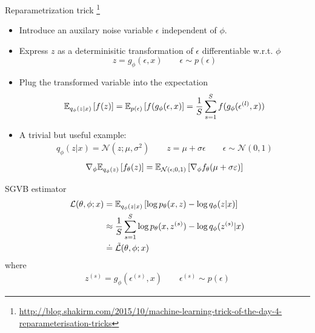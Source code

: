 \documentclass[unicode,11pt]{beamer}
\begin{document}
\begin{frame}{Reparametrization trick%
  \footnote{\url{http://blog.shakirm.com/2015/10/machine-learning-trick-of-the-day-4-reparameterisation-tricks}}}
  \begin{itemize}
  \item Introduce an auxilary noise variable $\epsilon$ independent of $\phi$.
  \item Express $z$ as a determinisitic transformation of $\epsilon$
    differentiable w.r.t. $\phi$
    $$
    z = g_\phi(\epsilon, x)
    \qquad
    \epsilon \sim p(\epsilon)
    $$
  \item Plug the transformed variable into the expectation
    \begin{align*}
      \E{q_\phi(z|x)}{f(z)}
      = \E{p(\epsilon)}{f(g_\phi(\epsilon, x)}
      = \frac{1}{S} \sum\limits_{s = 1}^S f(g_\phi(\epsilon^{(l)}, x))
    \end{align*}
  \item A trivial but useful example:
    \begin{align*}
      q_\phi(z|x) = \mathcal{N}(z; \mu, \sigma^2)
      \qquad
      z = \mu + \sigma\epsilon
      \qquad
      \epsilon \sim \mathcal{N}(0, 1)
    \end{align*}
    \begin{align*}
      \grad_\phi \E{q_\phi(z)}{f_\theta(z)}
      = \E{\mathcal{N}(\epsilon; 0, 1)}{\grad_\phi f_\theta(\mu + \sigma \varepsilon)}
    \end{align*}
  \end{itemize}
\end{frame}


\begin{frame}[fragile]{SGVB estimator}
  \begin{align*}
    \mathcal{L}(\theta, \phi; x)
    &= \E{q_\phi(z|x)}{\log p_\theta(x, z) - \log q_\phi(z|x)} \\
    &\approx \frac{1}{S} \sum\limits_{s = 1}^S
          \log p_\theta(x, z^{(s)}) - \log q_\phi(z^{(s)}|x) \\
    &\doteq \tilde{\mathcal{L}}(\theta, \phi; x)
  \end{align*}
  where
  \begin{align*}
    z^{(s)} = g_\phi(\epsilon^{(s)}, x)
    \qquad
    \epsilon^{(s)} \sim p(\epsilon)
  \end{align*}
\end{frame}

\end{document}

